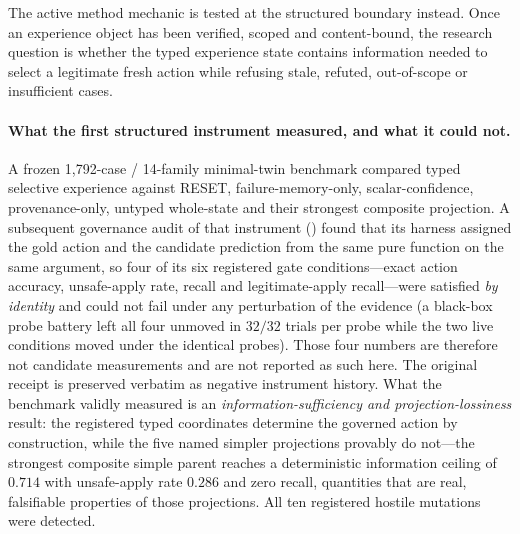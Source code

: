 The active method mechanic is tested at the structured boundary instead. Once an experience object has been verified, scoped and content-bound, the research question is whether the typed experience state contains information needed to select a legitimate fresh action while refusing stale, refuted, out-of-scope or insufficient cases.

\paragraph{What the first structured instrument measured, and what it could not.}
A frozen 1,792-case / 14-family minimal-twin benchmark compared typed selective experience against RESET, failure-memory-only, scalar-confidence, provenance-only, untyped whole-state and their strongest composite projection. A subsequent governance audit of that instrument () found that its harness assigned the gold action and the candidate prediction from the same pure function on the same argument, so four of its six registered gate conditions---exact action accuracy, unsafe-apply rate, \CANNOTCHECK{} recall and legitimate-apply recall---were satisfied \emph{by identity} and could not fail under any perturbation of the evidence (a black-box probe battery left all four unmoved in $32/32$ trials per probe while the two live conditions moved under the identical probes). Those four numbers are therefore not candidate measurements and are not reported as such here. The original receipt is preserved verbatim as negative instrument history. What the benchmark validly measured is an \emph{information-sufficiency and projection-lossiness} result: the registered typed coordinates determine the governed action by construction, while the five named simpler projections provably do not---the strongest composite simple parent reaches a deterministic information ceiling of $0.714$ with unsafe-apply rate $0.286$ and zero \CANNOTCHECK{} recall, quantities that are real, falsifiable properties of those projections. All ten registered hostile mutations were detected.


